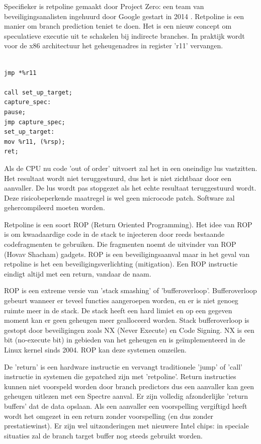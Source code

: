 Specifieker is retpoline gemaakt door Project Zero: een team van beveiligingsanalisten ingehuurd door Google gestart in 2014 \parencite{Evans2014}.
Retpoline is een manier om branch prediction teniet te doen.
Het is een nieuw concept om speculatieve executie uit te schakelen bij indirecte branches.
In praktijk wordt voor de x86 architectuur het geheugenadres in register 'r11' vervangen.


\begin{lstlisting}

jmp *%r11

call set_up_target;
capture_spec:         
pause;
jmp capture_spec;
set_up_target:
mov %r11, (%rsp);   
ret;    
\end{lstlisting}



\parencite{Turner2018}

Als de CPU nu code 'out of order' uitvoert zal het in een oneindige lus vastzitten. Het resultaat wordt niet teruggestuurd, dus het is niet zichtbaar door een aanvaller.
De lus wordt pas stopgezet als het echte resultaat teruggestuurd wordt.
Deze risicobeperkende maatregel is wel geen microcode patch. Software zal gehercompileerd moeten worden.

Retpoline is een soort ROP (Return Oriented Programming).\newline
Het idee van ROP  is om kwaadaardige code in de stack te injecteren door reeds bestaande codefragmenten te gebruiken.
Die fragmenten noemt de uitvinder van ROP (Hovav Shacham) gadgets. \parencite{Shacham2007}
ROP is een beveiligingsaanval maar in het geval van retpoline is het een beveiligingsverlichting (mitigation).
Een ROP instructie eindigt altijd met een return, vandaar de naam.


ROP is een extreme versie van 'stack smashing' of 'bufferoverloop'.
Bufferoverloop gebeurt wanneer er teveel functies aangeroepen worden, en er is niet genoeg ruimte meer in de stack. De stack heeft een hard limiet en op een gegeven moment kan er geen geheugen meer gealloceerd worden.
Stack bufferoverloop is gestopt door beveiligingen zoals NX (Never Execute) en Code Signing.
NX is een bit (no-execute bit) in gebieden van het geheugen en is geïmplementeerd in de Linux kernel sinds 2004.\parencite{KernelNewbies2004}
ROP kan deze systemen omzeilen.


De 'return' is een hardware instructie en vervangt traditionele 'jump' of 'call' instructie in systemen die gepatched zijn met 'retpoline'. Return instructies kunnen niet voorspeld worden door branch predictors dus een aanvaller kan geen geheugen uitlezen met een Spectre aanval.
Er zijn volledig afzonderlijke 'return buffers' dat de data opslaan. Als een aanvaller een voorspelling vergiftigd heeft wordt het omgezet in een return zonder voorspelling (en dus zonder prestatiewinst). Er zijn wel uitzonderingen met nieuwere Intel chips: in speciale situaties zal de branch target buffer nog steeds gebruikt worden.


